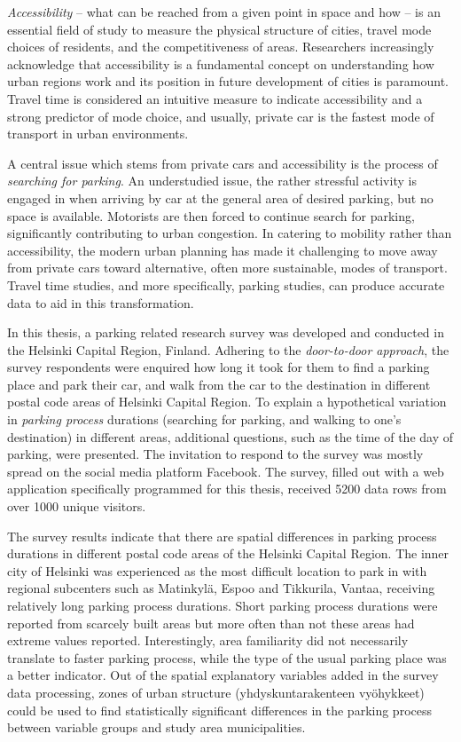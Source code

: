\justify
\textit{Accessibility} – what can be reached from a given point in space and how – is an essential field of study to measure the physical structure of cities, travel mode choices of residents, and the competitiveness of areas. Researchers increasingly acknowledge that accessibility is a fundamental concept on understanding how urban regions work and its position in future development of cities is paramount. Travel time is considered an intuitive measure to indicate accessibility and a strong predictor of mode choice, and usually, private car is the fastest mode of transport in urban environments. 

A central issue which stems from private cars and accessibility is the process of \textit{searching for parking}. An understudied issue, the rather stressful activity is engaged in when arriving by car at the general area of desired parking, but no space is available. Motorists are then forced to continue search for parking, significantly contributing to urban congestion. In catering to mobility rather than accessibility, the modern urban planning has made it challenging to move away from private cars toward alternative, often more sustainable, modes of transport. Travel time studies, and more specifically, parking studies, can produce accurate data to aid in this transformation.  

In this thesis, a parking related research survey was developed and conducted in the Helsinki Capital Region, Finland. Adhering to the \textit{door-to-door approach}, the survey respondents were enquired how long it took for them to find a parking place and park their car, and walk from the car to the destination in different postal code areas of Helsinki Capital Region. To explain a hypothetical variation in \textit{parking process} durations (searching for parking, and walking to one's destination) in different areas, additional questions, such as the time of the day of parking, were presented. The invitation to respond to the survey was mostly spread on the social media platform Facebook. The survey, filled out with a web application specifically programmed for this thesis, received 5200 data rows from over 1000 unique visitors.

The survey results indicate that there are spatial differences in parking process durations in different postal code areas of the Helsinki Capital Region. The inner city of Helsinki was experienced as the most difficult location to park in with regional subcenters such as Matinkylä, Espoo and Tikkurila, Vantaa, receiving relatively long parking process durations. Short parking process durations were reported from scarcely built areas but more often than not these areas had extreme values reported. Interestingly, area familiarity did not necessarily translate to faster parking process, while the type of the usual parking place was a better indicator. Out of the spatial explanatory variables added in the survey data processing, zones of urban structure (yhdyskuntarakenteen vyöhykkeet) could be used to find statistically significant differences in the parking process between variable groups and study area municipalities.

